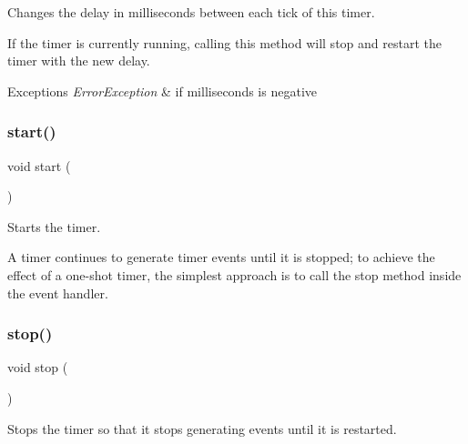 Changes the delay in milliseconds between each tick of this timer. 

If the timer is currently running, calling this method will stop and restart the timer with the new delay.


\begin{DoxyExceptions}{Exceptions}
{\em Error\+Exception} & if milliseconds is negative \\
\hline
\end{DoxyExceptions}
\mbox{\label{classsgl_1_1GTimer_a60de64d75454385b23995437f1d72669}} 
\subsubsection{\texorpdfstring{start()}{start()}}
{\footnotesize\ttfamily void start (\begin{DoxyParamCaption}{ }\end{DoxyParamCaption})}



Starts the timer. 

A timer continues to generate timer events until it is stopped; to achieve the effect of a one-\/shot timer, the simplest approach is to call the {\ttfamily stop} method inside the event handler. \mbox{\label{classsgl_1_1GTimer_a8c528baf37154d347366083f0f816846}} 
\subsubsection{\texorpdfstring{stop()}{stop()}}
{\footnotesize\ttfamily void stop (\begin{DoxyParamCaption}{ }\end{DoxyParamCaption})}



Stops the timer so that it stops generating events until it is restarted. 

